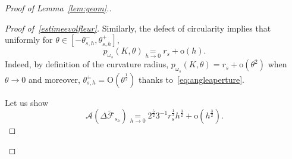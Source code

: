\documentclass[10pt]{amsart}
\theoremstyle{definition}\newtheorem{defi}[theo]{Definition}\newtheorem{rema}[theo]{Remark}\newtheorem{exam}[theo]{Example}\newtheorem{exem}[theo]{Example}\newtheorem{nota}[theo]{Notation}
\newcommand{\cA}{\mathcal{A}}
\newcommand{\cF}{\mathcal{F}}
\newcommand{\od}{\mathrm{o}}
\newcommand{\Odd}{\mathrm{O}}
\newcommand{\noi}{\noindent}
\newenvironment*{prooff}{\begin{proof}}{\let\qed\relax\end{proof}}
\begin{document}
\begin{proof}[{Proof of Lemma~\ref{lem:geom}.}]
\begin{prooff}[{Proof of~\eqref{estimeevolfleur}}]
Similarly, the defect of circularity implies that uniformly for $\theta\in [-\theta_{s,h}^-,\theta_{s,h}^+]$,
\begin{equation}\label{eq:defectcircularity}
p_{\omega_s}(K,\theta) \underset{h\to 0}{=} r_s+\od(h).
\end{equation}
Indeed, by definition of the curvature radius, $p_{\omega_s}(K,\theta)=r_s+\od(\theta^2)$ when $\theta\to 0$ and moreover, $\theta_{s,h}^{\pm}=\Odd(\theta^{\frac12})$ thanks to~\eqref{eq:angleaperture}.

Let us show
\begin{equation}\label{eq:voldifflow2}
\cA\left(\Delta\widetilde{\cF}_{s_h}\right)\underset{h\to 0}{=}2^{\frac{5}{2}}3^{-1} r_s^{\frac1{2}}h^{\frac{3}{2}} + \od\left(h^{\frac32}\right).
\end{equation}


\end{prooff}
\end{proof}
\end{document}
